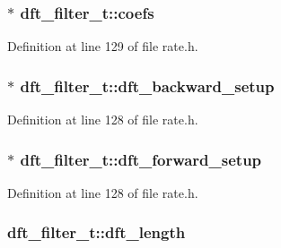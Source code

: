 \subsubsection[{\texorpdfstring{coefs}{coefs}}]{$\ast$ dft\+\_\+filter\+\_\+t\+::coefs}\hypertarget{structdft__filter__t_a377dcb7533ed8c11f3a8c16ae59b0553}{}\label{structdft__filter__t_a377dcb7533ed8c11f3a8c16ae59b0553}


Definition at line 129 of file rate.\+h.

\subsubsection[{\texorpdfstring{dft\+\_\+backward\+\_\+setup}{dft_backward_setup}}]{ $\ast$ dft\+\_\+filter\+\_\+t\+::dft\+\_\+backward\+\_\+setup}\hypertarget{structdft__filter__t_ad0d3cbe82de5ac41f5677677bbe6b23f}{}\label{structdft__filter__t_ad0d3cbe82de5ac41f5677677bbe6b23f}


Definition at line 128 of file rate.\+h.

\subsubsection[{\texorpdfstring{dft\+\_\+forward\+\_\+setup}{dft_forward_setup}}]{$\ast$ dft\+\_\+filter\+\_\+t\+::dft\+\_\+forward\+\_\+setup}\hypertarget{structdft__filter__t_a22109e9b248cf3ebf57ea693f2977ec7}{}\label{structdft__filter__t_a22109e9b248cf3ebf57ea693f2977ec7}


Definition at line 128 of file rate.\+h.

\subsubsection[{\texorpdfstring{dft\+\_\+length}{dft_length}}]{ dft\+\_\+filter\+\_\+t\+::dft\+\_\+length}\hypertarget{structdft__filter__t_ac0a7e11a9e26c9a8fab21c6ea0743d83}{}\label{structdft__filter__t_ac0a7e11a9e26c9a8fab21c6ea0743d83}


